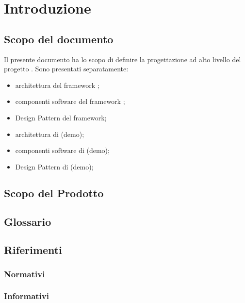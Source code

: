 \section{Introduzione}

\subsection{Scopo del documento}

Il presente documento ha lo scopo di definire la progettazione ad alto livello del progetto \ProjectName. Sono presentati separatamente:
\begin{itemize}
	\item architettura del framework \ProjectName;
	\item componenti software del framework \ProjectName;
	\item Design Pattern del framework\ProjectName;
	\item architettura di \DemoName (demo);
	\item componenti software di \DemoName (demo);
	\item Design Pattern di \DemoName (demo);
\end{itemize}

\subsection{Scopo del Prodotto}
\ScopoDelProdotto

\subsection{Glossario}
\GlossarioIntroduzione

\subsection{Riferimenti}
\subsubsection{Normativi}
\subsubsection{Informativi}